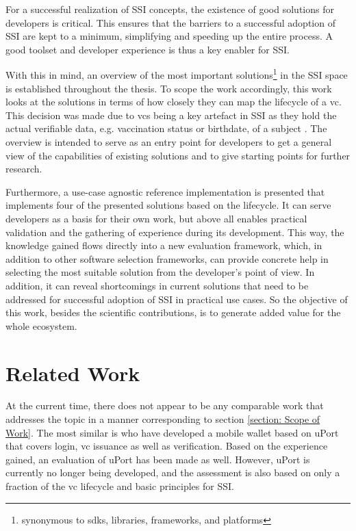 	For a successful realization of \acf{SSI} concepts, the existence of good solutions for developers is critical. This ensures that the barriers to a successful adoption of \ac{SSI} are kept to a minimum, simplifying and speeding up the entire process. A good toolset and developer experience is thus a key enabler for \ac{SSI}.
	
	With this in mind, an overview of the most important solutions\footnote{synonymous to \acp{sdk}, libraries, frameworks, and platforms} in the \ac{SSI} space is established throughout the thesis. To scope the work accordingly, this work looks at the solutions in terms of how closely they can map the lifecycle of a \acf{vc}. This decision was made due to \acsp{vc} being a key artefact in \ac{SSI} as they hold the actual verifiable data, e.g. vaccination status or birthdate, of a subject \cite{sporny_verifiable_2019}. The overview is intended to serve as an entry point for developers to get a general view of the capabilities of existing solutions and to give starting points for further research. 
	
	Furthermore, a use-case agnostic reference implementation is presented that implements four of the presented solutions based on the lifecycle. It can serve developers as a basis for their own work, but above all enables practical validation and the gathering of experience during its development. This way, the knowledge gained flows directly into a new evaluation framework, which, in addition to other software selection frameworks, can provide concrete help in selecting the most suitable solution from the developer's point of view. In addition, it can reveal shortcomings in current solutions that need to be addressed for successful adoption of \ac{SSI} in practical use cases. So the objective of this work, besides the scientific contributions, is to generate added value for the whole ecosystem.
	
	\section{Related Work} %
	
	At the current time, there does not appear to be any comparable work that addresses the topic in a manner corresponding to section \ref{section: Scope of Work}. The most similar is \cite{naik_uport_2020} who have developed a mobile wallet based on uPort that covers login, \ac{vc} issuance as well as verification. Based on the experience gained, an evaluation of uPort has been made as well. However, uPort is currently no longer being developed, and the assessment is also based on only a fraction of the \acs{vc} lifecycle and basic principles for \ac{SSI}.
	
